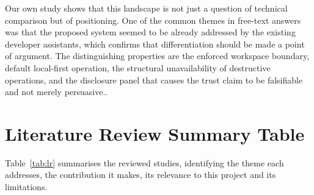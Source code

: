 \documentclass{FastFyp}
\begin{document}
Our own study shows that this landscape is not just a question of technical comparison but of positioning. One of the common themes in free-text answers was that the proposed system seemed to be already addressed by the existing developer assistants, which confirms that differentiation should be made a point of argument. The distinguishing properties are the enforced workspace boundary, default local-first operation, the structural unavailability of destructive operations, and the disclosure panel that causes the trust claim to be falsifiable and not merely persuasive..

\section{Literature Review Summary Table}
Table~\ref{tab:lr} summarises the reviewed studies, identifying the theme each addresses, the contribution it makes, its relevance to this project and its limitations.
\end{document}
